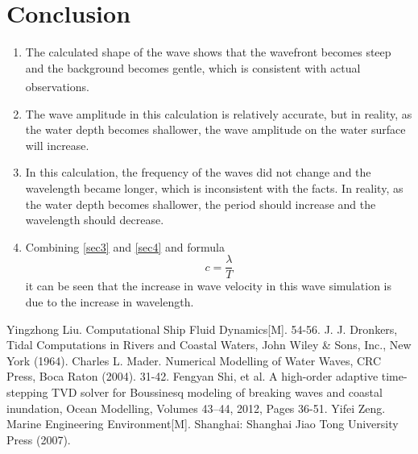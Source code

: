 \documentclass[10pt,a4paper]{article}
\newcommand{\upcite}[1]{\textsuperscript{\zihao{5}\cite{#1}}}
\begin{document}
\newpage
\section{Conclusion}

\begin{enumerate}
	\item The calculated shape of the wave shows that the wavefront becomes steep and the background becomes gentle, which is consistent with actual observations.\upcite{5}
	\item The wave amplitude in this calculation is relatively accurate, but in reality, as the water depth becomes shallower, the wave amplitude on the water surface will increase.
	\item In this calculation, the frequency of the waves did not change and the wavelength became longer, which is inconsistent with the facts. In reality, as the water depth becomes shallower, the period should increase and the wavelength should decrease.
	\item Combining \ref{sec3} and \ref{sec4} and formula
	$$c = \frac{\lambda}{T}$$
	it can be seen that the increase in wave velocity in this wave simulation is due to the increase in wavelength.
\end{enumerate}


\newpage
\begin{thebibliography}{1}
	 Yingzhong Liu. Computational Ship Fluid Dynamics[M]. 54-56.
	 J. J. Dronkers, Tidal Computations in Rivers and Coastal Waters, John Wiley \& Sons, Inc., New York (1964).
	 Charles L. Mader. Numerical Modelling of Water Waves, CRC Press, Boca Raton (2004). 31-42.
	 Fengyan Shi, et al. A high-order adaptive time-stepping TVD solver for Boussinesq modeling of breaking waves and coastal inundation, Ocean Modelling, Volumes 43–44, 2012, Pages 36-51.
	 Yifei Zeng. Marine Engineering Environment[M]. Shanghai: Shanghai Jiao Tong University Press (2007).
\end{thebibliography}
\end{document}
